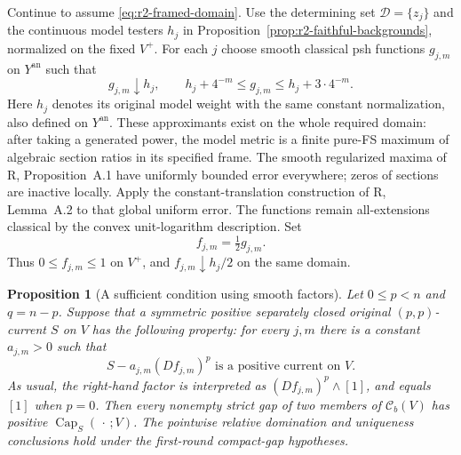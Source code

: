 \documentclass[11pt,a4paper]{article}
\numberwithin{equation}{section}
\newtheorem{proposition}[theorem]{Proposition}
\theoremstyle{definition}
\theoremstyle{remark}
\newcommand{\Cb}{\mathcal C_b}
\begin{document}
Continue to assume \eqref{eq:r2-framed-domain}. Use the determining
set $\mathscr D=\{z_j\}$ and the continuous model testers $h_j$ in
Proposition~\ref{prop:r2-faithful-backgrounds}, normalized on the fixed
$V^+$. For each $j$ choose smooth classical psh functions $g_{j,m}$ on
$Y^{\mathrm{an}}$ such that
\[
 g_{j,m}\downarrow h_j,\qquad
 h_j+4^{-m}\leq g_{j,m}\leq h_j+3\cdot4^{-m}.
 \tag{S}\label{eq:r2-smooth-detectors}
\]
Here $h_j$ denotes its original model weight with the same constant
normalization, also defined on $Y^{\mathrm{an}}$. These approximants
exist on the whole required domain: after taking a generated power,
the model metric is a finite pure-FS maximum of algebraic section
ratios in its specified frame. The smooth regularized maxima of
\textup{R}, Proposition~A.1 have uniformly bounded error everywhere;
zeros of sections are inactive locally. Apply the constant-translation
construction of \textup{R}, Lemma~A.2 to that global uniform error.
The functions remain all-extensions classical by the convex
unit-logarithm description. Set
\[
 f_{j,m}=\tfrac12 g_{j,m}.
\]
Thus $0\leq f_{j,m}\leq1$ on $V^+$, and
$f_{j,m}\downarrow h_j/2$ on the same domain.

\begin{proposition}[A sufficient condition using smooth factors]
\label{prop:r2-smooth-factor-condition}
Let $0\leq p<n$ and $q=n-p$. Suppose that a symmetric positive
separately closed original $(p,p)$-current $S$ on $V$ has the following
property: for every $j,m$ there is a constant $a_{j,m}>0$ such that
\[
 S-a_{j,m}(Df_{j,m})^p\text{ is a positive current on }V.
 \tag{F}\label{eq:r2-smooth-factor-condition}
\]
As usual, the right-hand factor is interpreted as
$(Df_{j,m})^p\wedge[1]$, and equals $[1]$ when $p=0$.
Then every nonempty strict gap of two members of $\Cb(V)$ has
positive $\operatorname{Cap}_S(\,\cdot\,;V)$. The pointwise relative
domination and uniqueness conclusions hold under the first-round
compact-gap hypotheses.
\end{proposition}
\end{document}
